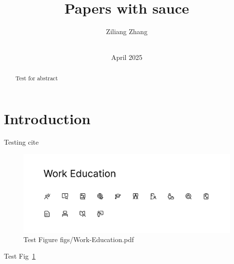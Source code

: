 \documentclass[10pt,conference]{IEEEtran}
\title{Papers with sauce}
\author{%
Ziliang Zhang\\
\affaddr{University of California, Riverside}\\
}
\date{April 2025}
\theoremstyle{definition}
\begin{document}
\maketitle

\thispagestyle{fancy}

\begin{abstract} 
Test for abstract
\end{abstract}

\section{Introduction}

Testing cite~\cite{nano}

\begin{figure}[t]
\includegraphics[width=\linewidth]{figs/Work-Education.pdf}
\caption{Test Figure figs/Work-Education.pdf}
\label{fig:test}
\end{figure}

Test Fig~\ref{fig:test}



\end{document}
